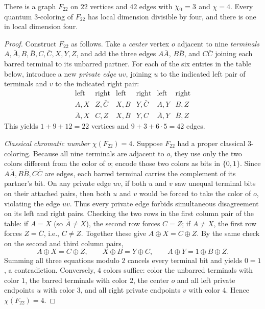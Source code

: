 \begin{proposition}\label{prop:twentytwo}
There is a graph $F_{22}$ on $22$ vertices and $42$ edges with $\chi_{\mathrm q}=3$ and $\chi=4$. Every quantum $3$-coloring of $F_{22}$ has local dimension divisible by four, and there is one in local dimension four.
\end{proposition}
\begin{proof}
Construct $F_{22}$ as follows. Take a \emph{center} vertex $o$ adjacent to nine \emph{terminals} $A,\bar A,B,\bar B,C,\bar C,X,Y,Z$, and add the three edges $A\bar A$, $B\bar B$, and $C\bar C$ joining each barred terminal to its unbarred partner. For each of the six entries in the table below, introduce a new \emph{private edge} $uv$, joining $u$ to the indicated left pair of terminals and $v$ to the indicated right pair:
\[
\begin{array}{cc|cc|cc}
\text{left}&\text{right}&\text{left}&\text{right}&\text{left}&\text{right}\\ \hline
 A,X&Z,\bar C & X,B&Y,\bar C & A,Y&B,Z\\
 \bar A,X&C,Z & X,\bar B&Y,C & \bar A,Y&\bar B,Z
\end{array}
\]
This yields $1+9+12=22$ vertices and $9+3+6\cdot5=42$ edges.

\emph{Classical chromatic number $\chi(F_{22})=4$.} Suppose $F_{22}$ had a proper classical $3$-coloring. Because all nine terminals are adjacent to $o$, they use only the two colors different from the color of $o$; encode those two colors as bits in $\{0,1\}$. Since $A\bar A,B\bar B,C\bar C$ are edges, each barred terminal carries the complement of its partner's bit. On any private edge $uv$, if both $u$ and $v$ saw unequal terminal bits on their attached pairs, then both $u$ and $v$ would be forced to take the color of $o$, violating the edge $uv$. Thus every private edge forbids simultaneous disagreement on its left and right pairs. Checking the two rows in the first column pair of the table: if $A=X$ (so $\bar A\ne X$), the second row forces $C=Z$; if $A\ne X$, the first row forces $Z=\bar C$, i.e., $C\ne Z$. Together these give $A\oplus X=C\oplus Z$. By the same check on the second and third column pairs,
\[
 A\oplus X=C\oplus Z,\qquad X\oplus B=Y\oplus C,\qquad A\oplus Y=1\oplus B\oplus Z.
\]
Summing all three equations modulo $2$ cancels every terminal bit and yields $0=1$, a contradiction. Conversely, $4$ colors suffice: color the unbarred terminals with color $1$, the barred terminals with color $2$, the center $o$ and all left private endpoints $u$ with color $3$, and all right private endpoints $v$ with color $4$. Hence $\chi(F_{22})=4$.


\end{proof}
